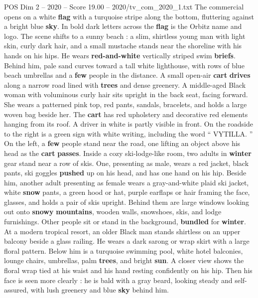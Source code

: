 \begin{textsample}{POS Dim 2 – 2020 – Score 19.00 – 2020/tv\_com\_2020\_1.txt}  \label{ex:f2_pos_047}
The commercial opens on a white \textbf{flag} with a turquoise stripe along the bottom, fluttering against a bright blue \textbf{sky}.
In bold dark letters across the \textbf{flag} is the Orbitz name and logo.
The scene shifts to a sunny beach : a slim, shirtless young man with light skin, curly dark hair, and a small mustache stands near the shoreline with his hands on his hips.
He wears \textbf{red-and-white} vertically striped swim \textbf{briefs}.
Behind him, pale sand curves toward a tall white lighthouse, with rows of blue beach umbrellas and a \textbf{few} people in the distance.
A small open-air \textbf{cart} \textbf{drives} along a narrow road lined with \textbf{trees} and dense greenery.
A middle-aged Black woman with voluminous curly hair sits upright in the back seat, facing forward.
She wears a patterned pink top, red pants, sandals, bracelets, and holds a large woven bag beside her.
The \textbf{cart} has red upholstery and decorative red elements hanging from its roof.
A driver in white is partly visible in front.
On the roadside to the right is a green sign with white writing, including the word “ VYTILLA. ” On the left, a \textbf{few} people stand near the road, one lifting an object above his head as the \textbf{cart} \textbf{passes}.
Inside a cozy ski-lodge-like room, two adults in \textbf{winter} gear stand near a row of skis.
One, presenting as male, wears a red jacket, black pants, ski goggles \textbf{pushed} up on his head, and has one hand on his hip.
Beside him, another adult presenting as female wears a gray-and-white plaid ski jacket, white \textbf{snow} pants, a green hood or hat, purple earflaps or hair framing the face, glasses, and holds a pair of skis upright.
Behind them are large windows looking out onto \textbf{snowy} \textbf{mountains}, wooden walls, snowshoes, skis, and lodge furnishings.
Other people sit or stand in the background, \textbf{bundled} for \textbf{winter}.
At a modern tropical resort, an older Black man stands shirtless on an upper balcony beside a glass railing.
He wears a dark sarong or wrap skirt with a large floral pattern.
Below him is a turquoise swimming pool, white hotel balconies, lounge chairs, umbrellas, palm \textbf{trees}, and bright \textbf{sun}.
A closer view shows the floral wrap tied at his waist and his hand resting confidently on his hip.
Then his face is seen more clearly : he is bald with a gray beard, looking steady and self-assured, with lush greenery and blue \textbf{sky} behind him.

\end{textsample}
